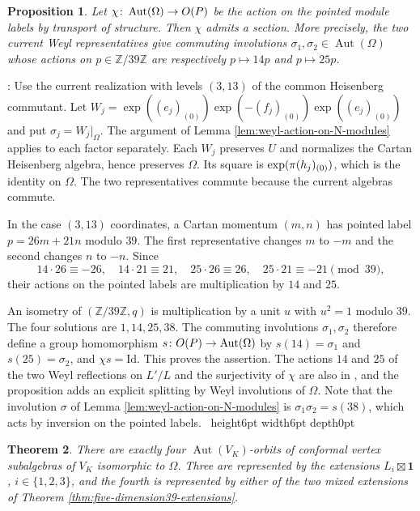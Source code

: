 \documentclass[leqno]{article}
\let\cal\relax
\newcommand{\cal}{\mathcal}
\newcommand{\Z}{\ensuremath{\mathbb{Z}}}
\newcommand{\Id}{\mathrm{Id}}
\newcommand{\qed}{\hfill \vrule height6pt  width6pt depth0pt}
\newcommand{\co}{\colon}
\let\i\relax
\newcommand{\i}{\mathrm{i}}
\newtheorem{thm}{Theorem}[section]
\newtheorem{prop}[thm]{Proposition}
\newenvironment{proof}[1][]{\noindent {\it Proof #1} : }{\hbox{~}\qed
\smallskip
}
\numberwithin{equation}{section}
\begin{document}
\begin{prop}
\label{prop:pointed-automorphism-section}
Let $\chi \co \operatorname{Aut}(\Omega) \to O(\cal P)$ be the action on the pointed module labels by transport of structure. Then $\chi$ admits a section. More precisely, the two current Weyl representatives give commuting involutions $\sigma_1,\sigma_2 \in \operatorname{Aut}(\Omega)$ whose actions on $p \in \Z/39\Z$ are respectively $p \mapsto 14p$ and $p \mapsto 25p$.
\end{prop}

\begin{proof}
Use the current realization with levels $(3,13)$ of the common Heisenberg commutant. Let $W_j = \exp((e_j)_{(0)})\exp(-(f_j)_{(0)})\exp((e_j)_{(0)})$ and put $\sigma_j = W_j|_\Omega$. The argument of Lemma \ref{lem:weyl-action-on-N-modules} applies to each factor separately. Each $W_j$ preserves $U$ and normalizes the Cartan Heisenberg algebra, hence preserves $\Omega$. Its square is $\exp(\pi\i(h_j)_{(0)})$, which is the identity on $\Omega$. The two representatives commute because the current algebras commute.

In the case $(3,13)$ coordinates, a Cartan momentum $(m,n)$ has pointed label $p = 26m+21n$ modulo $39$. The first representative changes $m$ to $-m$ and the second changes $n$ to $-n$. Since
\[
14\cdot26 \equiv -26,\quad 14\cdot21 \equiv 21,\quad
25\cdot26 \equiv 26,\quad 25\cdot21 \equiv -21\pmod {39},
\]
their actions on the pointed labels are multiplication by $14$ and $25$.

An isometry of $(\Z/39\Z,q)$ is multiplication by a unit $u$ with $u^2 = 1$ modulo $39$. The four solutions are $1,14,25,38$. The commuting involutions $\sigma_1,\sigma_2$ therefore define a group homomorphism $s \co O(\cal P) \to \operatorname{Aut}(\Omega)$ by $s(14) = \sigma_1$ and $s(25) = \sigma_2$, and $\chi s = \Id$. This proves the assertion. The actions $14$ and $25$ of the two Weyl reflections on $L'/L$ and the surjectivity of $\chi$ are also in \cite[Lemma 12.1(4) p.~61 and Theorem 12.3(2) p.~64]{Arh26a}, and the proposition adds an explicit splitting by Weyl involutions of $\Omega$. Note that the involution $\sigma$ of Lemma \ref{lem:weyl-action-on-N-modules} is $\sigma_1\sigma_2 = s(38)$, which acts by inversion on the pointed labels.
\end{proof}

\begin{thm}
\label{thm:four-image-orbits}
There are exactly four $\operatorname{Aut}(V_K)$-orbits of conformal vertex subalgebras of $V_K$ isomorphic to $\Omega$. Three are represented by the extensions $L_i\boxtimes\mathbf1$, $i \in \{1,2,3\}$, and the fourth is represented by either of the two mixed extensions of Theorem \ref{thm:five-dimension39-extensions}.
\end{thm}
\end{document}

